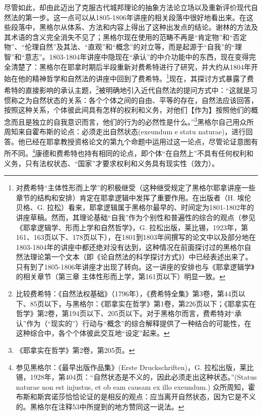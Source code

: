 尽管如此，却由此迈出了克服古代城邦理论的抽象方法论立场以及重新评价现代自然法的第一步。这一点可以从1805-1806年讲座的相关段落中很好地看出来。在这些段落中，黑格尔从体系、方法和内容上得出了这种出发点的结论。谢林的方法及其术语的含义完全消失不见了；黑格尔现在使用的范畴不再是“肯定物”和“否定物”、“伦理自然”及其法、“直观”和“概念”的对立等，而是起源于“自我”的“理智”和“意志”。1803-1804年讲座中隐现在“承认”的中介功能中的东西，现在变得完全清楚了：黑格尔在耶拿时期后半段重新对费希特进行了研究，并大约从1804年开始在他的精神哲学和自然法的讲座中回到了费希特。\footnote{对费希特“主体性形而上学”的积极继受（这种继受规定了黑格尔耶拿讲座一些章节的结构和安排）肯定在耶拿逻辑中发挥了重要作用。在出版者（H. 埃伦贝格、G. 拉松）看来，耶拿逻辑属于黑格尔最早的、时间定为1801-1802年的讲座草稿。然而，其理论基础“自我”作为个别性和普遍性的综合的观点（参见《耶拿逻辑学、形而上学和自然哲学》，G. 拉松出版，莱比锡，1923年，第161、163页以下、178页以下），在1801到1803年间撰写的论文中以及部分地在1803-1804年的讲座中都还绝对没有达到，这种情况在前面探讨过的黑格尔自然法理论第一个文本（即《论自然法的科学探讨方式》）中已经表述出来了。只有到了1805-1806年讲座才出现了转向。这一讲座的安排也与《耶拿逻辑学》的相关章节（第三章 主体性形而上学，第161页以下）明显一致。}现在，其探讨方式暴露了费希特的直接影响的承认主题，\footnote{比较费希特：《自然法权基础》（1796年），《费希特全集》第3卷，第44页以下、85页以下，与黑格尔：《耶拿实在哲学》第1卷，第226页以下；《耶拿实在哲学》第2卷，第194页以下、205页以下。对于黑格尔而言，费希特对“承认”作为（“现实的”）行动与“概念”的综合解释提供了一种结合的可能性，在这种综合中，各个个体彼此交互地“设定”起来。}被明确地引入近代自然法的提问方式中：“这就是习惯称之为自然状态的关系：各个个体之间的自由、平等的存在，自然法应该回答，按照这种关系，个体彼此间具有怎样的权利和义务，对他们【作为】按照他们的概念而且是独立的自我意识而言，他们的行为的必然性是什么。”\footnote{《耶拿实在哲学》第2卷，第205页。}黑格尔自己用众所周知来自霍布斯的论点：必须走出自然状态(exeundum e statu naturae)，进行回答。他已经在耶拿教授资格论文的第九个命题中运用过这一论点，尽管论证意图有所不同。\footnote{参见黑格尔：《最早出版作品集》(Erste Druckschriften)，G. 拉松出版，莱比锡，1928年，第404页：“自然状态是不义的，因此必须走出这种状态。”(Status naturae non est injustus, et ob eam causam ex illo exeundum.) 众所周知，霍布斯和斯宾诺莎恰恰论证的是相反的观点：应当离开自然状态，因为它是不义的。黑格尔在注释53中所提到的地方赞同这一说法。}康德和费希特也持有相同的论点，即个体“在自然上”不具有任何权利和义务，只有法权状态、“国家”才要求权利和义务具有现实性（效力）。


